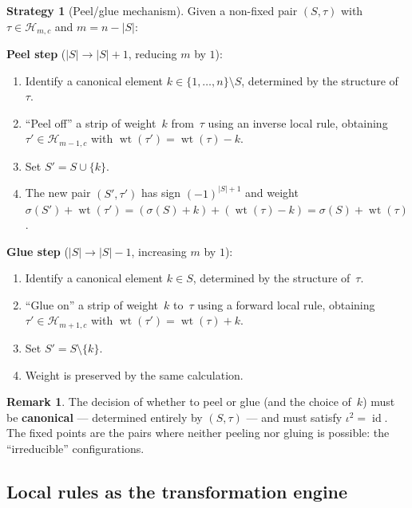 \documentclass[11pt]{article}
\theoremstyle{plain}
\theoremstyle{definition}
\newtheorem{remark}[theorem]{Remark}
\newtheorem{strategy}[theorem]{Strategy}
\begin{document}
\begin{strategy}[Peel/glue mechanism]
\label{strat:peel-glue}
Given a non-fixed pair $(S, \tau)$ with $\tau \in \mathcal{H}_{m,c}$
and $m = n - |S|$:

\medskip
\noindent\textbf{Peel step} ($|S| \to |S|+1$, reducing $m$ by $1$):
\begin{enumerate}
  \item Identify a canonical element $k \in \{1, \ldots, n\} \setminus S$,
    determined by the structure of~$\tau$.
  \item ``Peel off'' a strip of weight~$k$ from~$\tau$ using an
    inverse local rule, obtaining $\tau' \in \mathcal{H}_{m-1,c}$
    with $\operatorname{wt}(\tau') = \operatorname{wt}(\tau) - k$.
  \item Set $S' = S \cup \{k\}$.
  \item The new pair $(S', \tau')$ has sign $(-1)^{|S|+1}$ and weight
    $\sigma(S') + \operatorname{wt}(\tau')
    = (\sigma(S) + k) + (\operatorname{wt}(\tau) - k)
    = \sigma(S) + \operatorname{wt}(\tau)$.
\end{enumerate}

\medskip
\noindent\textbf{Glue step} ($|S| \to |S|-1$, increasing $m$ by $1$):
\begin{enumerate}
  \item Identify a canonical element $k \in S$, determined by the
    structure of~$\tau$.
  \item ``Glue on'' a strip of weight~$k$ to~$\tau$ using a
    forward local rule, obtaining $\tau' \in \mathcal{H}_{m+1,c}$
    with $\operatorname{wt}(\tau') = \operatorname{wt}(\tau) + k$.
  \item Set $S' = S \setminus \{k\}$.
  \item Weight is preserved by the same calculation.
\end{enumerate}
\end{strategy}

\begin{remark}
The decision of whether to peel or glue (and the choice of~$k$)
must be \textbf{canonical} --- determined entirely by $(S, \tau)$ ---
and must satisfy $\iota^2 = \operatorname{id}$.  The fixed points
are the pairs where neither peeling nor gluing is possible: the
``irreducible'' configurations.
\end{remark}


\subsection{Local rules as the transformation engine}
\end{document}
